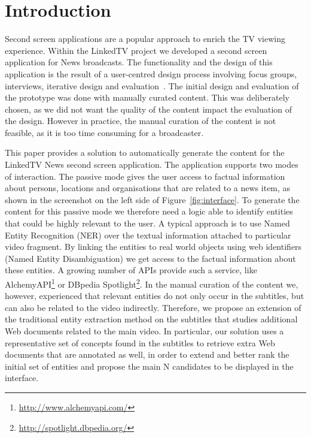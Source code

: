 \documentclass{llncs}
\begin{document}
\section{Introduction}
Second screen applications are a popular approach to enrich the TV viewing experience. Within the LinkedTV project we developed a second screen application for News broadcasts. The functionality and the design of this application is the result of a user-centred design process involving focus groups, interviews, iterative design and evaluation~\cite{lilia2013}. The initial design and evaluation of the prototype was done with manually curated content. This was deliberately chosen, as we did not want the quality of the content impact the evaluation of the design. However in practice, the manual curation of the content is not feasible, as it is too time consuming for a broadcaster.

This paper provides a solution to automatically generate the content for the LinkedTV News second screen application. The application supports two modes of interaction. The passive mode gives the user access to factual information about persons, locations and organisations that are related to a news item, as shown in the screenshot on the left side of Figure~\ref{fig:interface}. To generate the content for this passive mode we therefore need a logic able to identify entities that could be highly relevant to the user. A typical approach is to use Named Entity Recognition (NER) over the textual information attached to particular video fragment. By linking the entities to real world objects using web identifiers (Named Entity Disambiguation) we get access to the factual information about these entities. A growing number of APIs provide such a service, like AlchemyAPI\footnote{\fontsize{8pt}{1em}\selectfont \url{http://www.alchemyapi.com/}} or DBpedia Spotlight\footnote{\fontsize{8pt}{1em}\selectfont \url{http://spotlight.dbpedia.org/}}. %
In the manual curation of the content we, however, experienced that relevant entities do not only occur in the subtitles, but can also be related to the video indirectly. Therefore, we propose an extension of the traditional entity extraction method on the subtitles that studies additional Web documents related to the main video. In particular, our solution uses a representative set of concepts found in the subtitles to retrieve extra Web documents that are annotated as well, in order to extend and better rank the initial set of entities and propose the main N candidates to be displayed in the interface.
\end{document}
